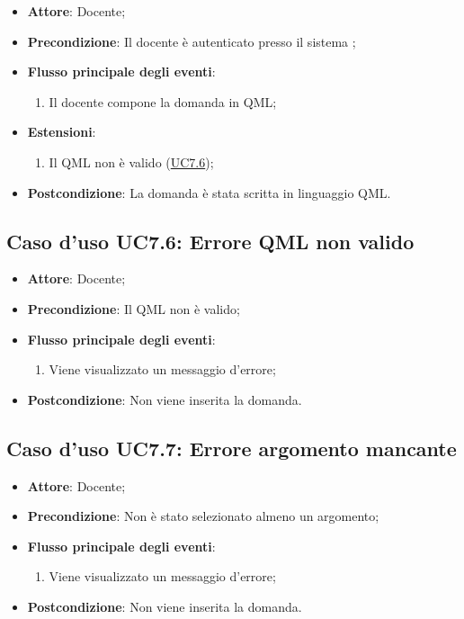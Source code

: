 \documentclass[12pt,a4paper]{article}
\begin{document}
\begin{itemize}

\item \textbf{Attore}: Docente; 
\item \textbf{Precondizione}: Il docente è autenticato presso il sistema
;

\item \textbf{Flusso principale degli eventi}:
\begin{enumerate}
	\item Il docente compone la domanda in QML;
	
\end{enumerate}
\item \textbf{Estensioni}:
\begin{enumerate}
	\item Il QML non è valido (\hyperlink{UC7.6}{UC7.6});
	
\end{enumerate}
\item \textbf{Postcondizione}: La domanda è stata scritta in linguaggio QML.
\end{itemize}
\hypertarget{UC7.6}{}
\subsection{Caso d'uso UC7.6: Errore QML non valido}

\begin{itemize}

\item \textbf{Attore}: Docente; 
\item \textbf{Precondizione}: Il QML non è valido;

\item \textbf{Flusso principale degli eventi}:
\begin{enumerate}
	\item Viene visualizzato un messaggio d'errore;
	
\end{enumerate}
\item \textbf{Postcondizione}: Non viene inserita la domanda.
\end{itemize}
\hypertarget{UC7.7}{}
\subsection{Caso d'uso UC7.7: Errore argomento mancante}

\begin{itemize}

\item \textbf{Attore}: Docente; 
\item \textbf{Precondizione}: Non è stato selezionato almeno un argomento;

\item \textbf{Flusso principale degli eventi}:
\begin{enumerate}
	\item Viene visualizzato un messaggio d'errore;
	
\end{enumerate}
\item \textbf{Postcondizione}: Non viene inserita la domanda.
\end{itemize}
\hypertarget{UC8}{}
\end{document}
